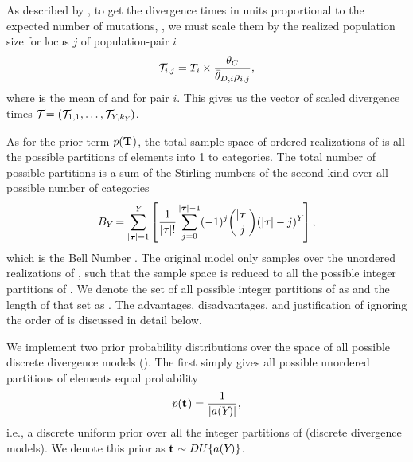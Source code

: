 \documentclass[letterpaper,12pt]{article}
\begin{document}
\begin{linenumbers}
\begin{linenomath}
As described by \citet{Oaks2012}, to get the divergence times in units
proportional to the expected number of mutations, \divTimeScaled{}{}, we must
scale them by the realized population size for locus $j$ of population-pair $i$ 
\begin{equation}
    \divTimeScaled{i}{j} = \divTimeMap{i} \times \frac{\myTheta{C}}{
        \descendantThetaMean{i} \ploidyScalar{i}{j}},
    \label{eq:divTimeScaled}
\end{equation}
where  is the mean of  and
 for pair $i$.
This gives us the vector of scaled divergence times
$\divTimeScaledVector = (\divTimeScaled{1}{1}, \ldots,
\divTimeScaled{\npairs{}}{\nloci{\npairs{}}})$.
\end{linenomath}


\begin{linenomath}
As for the prior term $p(\mathbf{T_{}})$,
the total sample space of ordered realizations of \divTimeMapVector is all the
possible partitions of \npairs{} elements into 1 to \npairs{} categories.
The total number of possible partitions is a sum of the Stirling numbers of
the second kind over all possible number of categories \divTimeNum
\begin{equation}
    B_{Y_{}}=\sum_{\lvert \boldsymbol{\tau_{}} \rvert=1}^{Y_{}} \left[
    \frac{1}{\lvert \boldsymbol{\tau_{}} \rvert!} \sum_{j=0}^{\lvert \boldsymbol{\tau_{}} \rvert-1} (-1)^{j}
    \binom{\lvert \boldsymbol{\tau_{}} \rvert}{j} (\lvert \boldsymbol{\tau_{}} \rvert-j)^{Y_{}} \right],
    \label{eq:bell}
\end{equation}
which is the Bell Number \citep{Bell1934}.
The original \msb model only samples over the unordered realizations of
\divTimeIndexVector, such that the sample space is reduced to all the possible
integer partitions of \npairs{} \citep{Oaks2012,Huang2011,OeisPartitionNumber,
    OeisPartitionTriangle,Malenfant2011}.
We denote the set of all possible integer partitions of \npairs{} as
\integerPartitionSet{\npairs{}} and the length of that set as
\integerPartitionNum{\npairs{}}.
The advantages, disadvantages, and justification of ignoring the order
of \divTimeIndexVector is discussed in detail below.
\end{linenomath}

\begin{linenomath}
We implement two prior probability distributions over the space
of all possible discrete divergence models (\divTimeIndexVector).
The first simply gives all possible unordered partitions of \npairs{} elements
equal probability
\begin{equation}
    p(\mathbf{t_{}}) = \frac{1}{\lvert a({Y_{}}) \rvert},
    \label{eq:divModelPriorUniform}
\end{equation}
i.e., a discrete uniform prior over all the integer partitions of \npairs{}
(discrete divergence models).
We denote this prior as
$\mathbf{t_{}} \sim DU\{a({Y_{}})\}$.
\end{linenomath}


\end{linenumbers}
\end{document}
